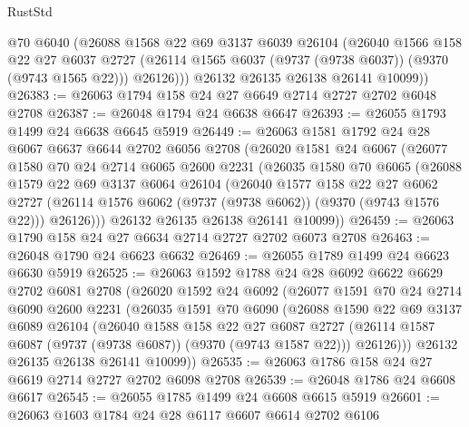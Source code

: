 \begin{lexlean}{RustStd}
\begin{coremodule}
          @70
          @6040
          (@26088
            @1568
            @22
            @69
            @3137
            @6039
            @26104
            (@26040
              @1566
              @158
              @22
              @27
              @6037
              @2727
              (@26114 @1565 @6037 (@9737 (@9738 @6037)) (@9370 (@9743 @1565 @22)))
              @26126)))
        @26132
        @26135
        @26138
        @26141
        @10099))
@26383 := @26063 @1794 @158 @24 @27 @6649 @2714 @2727 @2702 @6048 @2708
@26387 := @26048 @1794 @24 @6638 @6647
@26393 := @26055 @1793 @1499 @24 @6638 @6645 @5919
@26449 := @26063
    @1581
    @1792
    @24
    @28
    @6067
    @6637
    @6644
    @2702
    @6056
    @2708
    (@26020
      @1581
      @24
      @6067
      (@26077
        @1580
        @70
        @24
        @2714
        @6065
        @2600
        @2231
        (@26035
          @1580
          @70
          @6065
          (@26088
            @1579
            @22
            @69
            @3137
            @6064
            @26104
            (@26040
              @1577
              @158
              @22
              @27
              @6062
              @2727
              (@26114 @1576 @6062 (@9737 (@9738 @6062)) (@9370 (@9743 @1576 @22)))
              @26126)))
        @26132
        @26135
        @26138
        @26141
        @10099))
@26459 := @26063 @1790 @158 @24 @27 @6634 @2714 @2727 @2702 @6073 @2708
@26463 := @26048 @1790 @24 @6623 @6632
@26469 := @26055 @1789 @1499 @24 @6623 @6630 @5919
@26525 := @26063
    @1592
    @1788
    @24
    @28
    @6092
    @6622
    @6629
    @2702
    @6081
    @2708
    (@26020
      @1592
      @24
      @6092
      (@26077
        @1591
        @70
        @24
        @2714
        @6090
        @2600
        @2231
        (@26035
          @1591
          @70
          @6090
          (@26088
            @1590
            @22
            @69
            @3137
            @6089
            @26104
            (@26040
              @1588
              @158
              @22
              @27
              @6087
              @2727
              (@26114 @1587 @6087 (@9737 (@9738 @6087)) (@9370 (@9743 @1587 @22)))
              @26126)))
        @26132
        @26135
        @26138
        @26141
        @10099))
@26535 := @26063 @1786 @158 @24 @27 @6619 @2714 @2727 @2702 @6098 @2708
@26539 := @26048 @1786 @24 @6608 @6617
@26545 := @26055 @1785 @1499 @24 @6608 @6615 @5919
@26601 := @26063
    @1603
    @1784
    @24
    @28
    @6117
    @6607
    @6614
    @2702
    @6106

\end{coremodule}
\end{lexlean}
